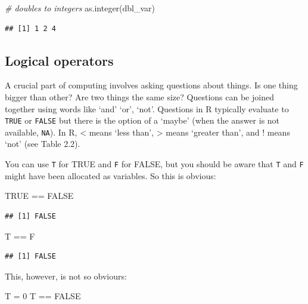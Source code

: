\documentclass[
]{book}
\newenvironment{Shaded}{\begin{snugshade}}{\end{snugshade}}
\newcommand{\CommentTok}[1]{\textcolor[rgb]{0.56,0.35,0.01}{\textit{#1}}}
\newcommand{\ConstantTok}[1]{\textcolor[rgb]{0.00,0.00,0.00}{#1}}
\newcommand{\DecValTok}[1]{\textcolor[rgb]{0.00,0.00,0.81}{#1}}
\newcommand{\FunctionTok}[1]{\textcolor[rgb]{0.00,0.00,0.00}{#1}}
\newcommand{\NormalTok}[1]{#1}
\newcommand{\OtherTok}[1]{\textcolor[rgb]{0.56,0.35,0.01}{#1}}
\newcommand{\SpecialCharTok}[1]{\textcolor[rgb]{0.00,0.00,0.00}{#1}}
\begin{document}
\begin{Shaded}
\begin{Highlighting}[]
\CommentTok{\# doubles to integers}
\FunctionTok{as.integer}\NormalTok{(dbl\_var)}
\end{Highlighting}
\end{Shaded}

\begin{verbatim}
## [1] 1 2 4
\end{verbatim}

\hypertarget{logical-operators}{%
\subsection{Logical operators}\label{logical-operators}}

A crucial part of computing involves asking questions about things. Is one thing bigger than other? Are two things the same size? Questions can be joined together using words like `and' `or', `not'. Questions in R typically evaluate to \texttt{TRUE} or \texttt{FALSE} but there is the option of a `maybe' (when the answer is not available, \texttt{NA}). In R, \textless{} means `less than', \textgreater{} means `greater than', and ! means `not' (see Table 2.2).

You can use \texttt{T} for TRUE and \texttt{F} for FALSE, but you should be aware that \texttt{T} and \texttt{F} might have been allocated
as variables. So this is obvious:

\begin{Shaded}
\begin{Highlighting}[]
\ConstantTok{TRUE} \SpecialCharTok{==} \ConstantTok{FALSE}
\end{Highlighting}
\end{Shaded}

\begin{verbatim}
## [1] FALSE
\end{verbatim}

\begin{Shaded}
\begin{Highlighting}[]
\NormalTok{T }\SpecialCharTok{==}\NormalTok{ F}
\end{Highlighting}
\end{Shaded}

\begin{verbatim}
## [1] FALSE
\end{verbatim}

This, however, is not so obviours:

\begin{Shaded}
\begin{Highlighting}[]
\NormalTok{T }\OtherTok{=} \DecValTok{0}
\NormalTok{T }\SpecialCharTok{==} \ConstantTok{FALSE}
\end{Highlighting}
\end{Shaded}
\end{document}
